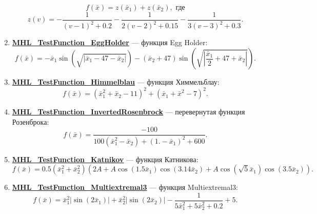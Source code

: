 \begin{enumerate}
\begin{equation}
 f\left( \bar{x}\right) = z\left( \bar{x}_1\right)+ z\left( \bar{x}_2\right), \text{ где}
 \end{equation}
 \begin{equation*}
 z\left( v\right)= -\dfrac{1}{\left( v-1\right)^2+0.2 }-\dfrac{1}{2\left( v-2\right)^2+0.15}-\dfrac{1}{3\left( v-3\right)^2+0.3}.
 \end{equation*}
 \item \hyperref[TestFunctions:section:MHL_TestFunction_EggHolder]{\textbf{MHL\_TestFunction\_EggHolder}} --- функция Egg Holder:
 \begin{equation}
 f\left( \bar{x}\right) = -\bar{x}_1\sin\left( \sqrt{\left| \bar{x}_1-47-\bar{x}_2\right| }\right)- (\bar{x}_2+47)\sin\left( \sqrt{\left| \dfrac{\bar{x}_1}{2}+47+\bar{x}_2\right| }\right).
 \end{equation}
 \item \hyperref[TestFunctions:section:MHL_TestFunction_Himmelblau]{\textbf{MHL\_TestFunction\_Himmelblau}} --- функция Химмельблау:
 \begin{equation}
 f\left( \bar{x}\right) = \left( \bar{x}_1^2+\bar{x}_2-11\right)^2+\left( \bar{x}_1+\bar{x}^2-7\right)^2.
 \end{equation}
 \item \hyperref[TestFunctions:section:MHL_TestFunction_InvertedRosenbrock]{\textbf{MHL\_TestFunction\_InvertedRosenbrock}} --- перевернутая функция Розенброка:
 \begin{equation}
 f\left( \bar{x}\right) =\dfrac{-100}{100\left( \bar{x}_1^2-\bar{x}_2\right) +\left( 1.-\bar{x}_1\right)^2+600}.
 \end{equation}
 \item \hyperref[TestFunctions:section:MHL_TestFunction_Katnikov]{\textbf{MHL\_TestFunction\_Katnikov}} --- функция Катникова:
 \begin{equation}
 f\left( \bar{x}\right) = 0.5\left( \bar{x}_1^2+\bar{x}_2^2\right) \left( 2A+A\cos\left( 1.5\bar{x}_1\right)\cos\left( 3.14\bar{x}_2\right)+A\cos\left( \sqrt{5}\bar{x}_1\right)\cos\left( 3.5\bar{x}_2\right)    \right).
 \end{equation}
 \item \hyperref[TestFunctions:section:MHL_TestFunction_Multiextremal3]{\textbf{MHL\_TestFunction\_Multiextremal3}} --- функция Multiextremal3:
 \begin{equation}
 f\left( \bar{x}\right) = \bar{x}_1^2\left| \sin\left( 2\bar{x}_1\right) \right| +\bar{x}_2^2\left| \sin\left( 2\bar{x}_2\right) \right| -\dfrac{1}{5\bar{x}_1^2+5\bar{x}_2^2+0.2} + 5.

\end{equation}
\end{enumerate}
